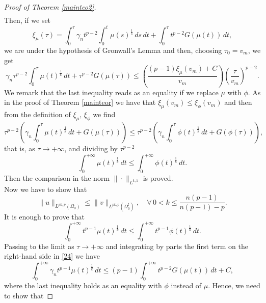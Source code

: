 \documentclass[12pt]{article}
\theoremstyle{definition}
\theoremstyle{plain}
\theoremstyle{definition}
\begin{document}
\begin{proof}[Proof of Theorem \ref{mainteo2}]
\begin{equation*}
\begin{split}
    \end{split}
    \end{equation*}
    Then, if we set
    \begin{equation*}
        \xi_\mu(\tau)=\int_0^\tau\gamma_nt^{p-2}\int_0^t\mu(s)^\frac{1}{s}\,ds\,dt+\int_0^\tau t^{p-2}G(\mu(t))\,dt, 
    \end{equation*}
    we are under the hypothesis of Gronwall's Lemma and then, choosing $\tau_0=v_m$, we get
    \begin{equation*}
        \gamma_n\tau^{p-2}\int_0^\tau\mu(t)^\frac{1}{k}\,dt+\tau^{p-2}G(\mu(\tau))\leq \left(\frac{(p-1)\xi_\mu(v_m)+C}{v_m}\right)\left(\frac{\tau}{v_m}\right)^{p-2}.
    \end{equation*}
    We remark that the last inequality reads as an equality if we replace $\mu$ with $\phi$. As in the proof of Theorem \ref{mainteor} we have that $\xi_\mu(v_m)\leq\xi_\phi(v_m)$ and then from the definition of $\xi_\mu,\,\xi_\phi$ we find
    \begin{equation*}
        \tau^{p-2}\left(\gamma_n\int_0^\tau \mu(t)^\frac{1}{k}\,dt+G(\mu(\tau))\right)\leq\tau^{p-2}\left(\gamma_n\int_0^\tau \phi(t)^\frac{1}{k}\,dt+G(\phi(\tau))\right),
    \end{equation*}
    that is, as $\tau\rightarrow+\infty$, and dividing by $\tau^{p-2}$
    \begin{equation*}
        \int_0^{+\infty}\mu(t)^\frac{1}{k}\,dt\leq\int_0^{+\infty}\phi(t)^\frac{1}{k}\,dt.
    \end{equation*}
    Then the comparison in the norm $\|\cdot\|_{L^{k,1}}$ is proved.\\
    Now we have to show that
    \begin{equation*}
        \|u\|_{L^{pk,p}(\Omega_0)}\leq \|v\|_{L^{pk,p}(\Omega_0^\sharp)}, \quad \forall\,0<k\leq\frac{n(p-1)}{n(p-1)-p}.
    \end{equation*}
    It is enough to prove that
    \begin{equation*}
        \int_0^{+\infty}t^{p-1}\mu(t)^\frac{1}{k}\,dt\leq\int_0^{+\infty}t^{p-1}\phi(t)^\frac{1}{k}\,dt.
    \end{equation*}
    Passing to the limit as $\tau\rightarrow+\infty$ and integrating by parts the first term on the right-hand side in \eqref{24} we have
    \begin{equation*}
        \int_0^{+\infty}\gamma_n t^{p-1}\mu(t)^\frac{1}{k}\,dt\leq (p-1)\int_0^{+\infty}t^{p-2}G(\mu(t))\,dt+C,
    \end{equation*}
    where the last inequality holds as an equality with $\phi$ instead of $\mu$. Hence, we need to show that

\end{proof}
\end{document}
